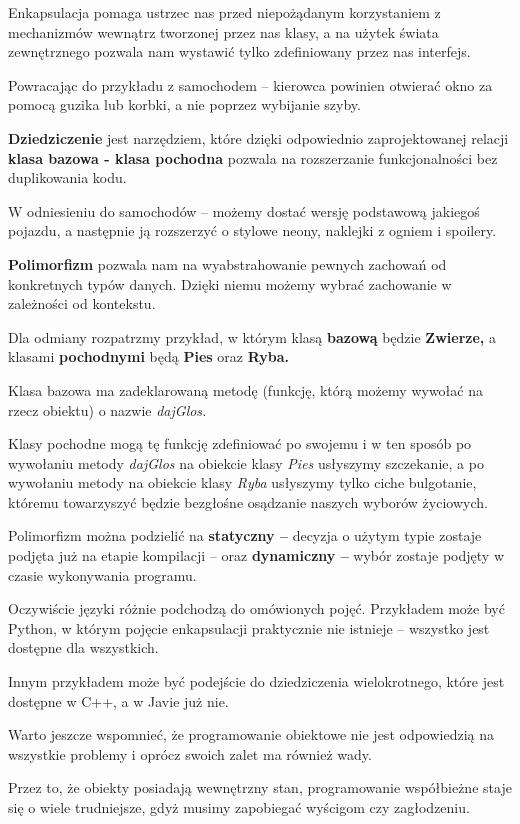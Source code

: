 Enkapsulacja pomaga ustrzec nas przed niepożądanym korzystaniem z mechanizmów wewnątrz tworzonej przez nas klasy, a na użytek świata zewnętrznego pozwala nam wystawić tylko zdefiniowany przez nas interfejs.

Powracając do przykładu z samochodem -- kierowca powinien otwierać okno za pomocą guzika lub korbki, a nie poprzez wybijanie szyby.

\textbf{Dziedziczenie} jest narzędziem, które dzięki odpowiednio zaprojektowanej relacji \textbf{klasa bazowa - klasa pochodna} pozwala na rozszerzanie funkcjonalności bez duplikowania kodu.

W odniesieniu do samochodów -- możemy dostać wersję podstawową jakiegoś pojazdu, a następnie ją rozszerzyć o stylowe neony, naklejki z ogniem i spoilery.

\textbf{Polimorfizm} pozwala nam na wyabstrahowanie pewnych zachowań od konkretnych typów danych. Dzięki niemu możemy wybrać zachowanie w zależności od kontekstu.

Dla odmiany rozpatrzmy przykład, w którym klasą \textbf{bazową} będzie \textbf{Zwierze,} a klasami \textbf{pochodnymi} będą \textbf{Pies} oraz \textbf{Ryba.}

Klasa bazowa ma zadeklarowaną metodę (funkcję, którą możemy wywołać na rzecz obiektu) o nazwie \textit{dajGlos.}

Klasy pochodne mogą tę funkcję zdefiniować po swojemu i w ten sposób po wywołaniu metody \textit{dajGlos} na obiekcie klasy \textit{Pies} usłyszymy szczekanie, a po wywołaniu metody na obiekcie klasy \textit{Ryba} usłyszymy tylko ciche bulgotanie, któremu towarzyszyć będzie bezgłośne osądzanie naszych wyborów życiowych.

Polimorfizm można podzielić na \textbf{statyczny --} decyzja o użytym typie zostaje podjęta już na etapie kompilacji -- oraz \textbf{dynamiczny --} wybór zostaje podjęty w czasie wykonywania programu.

Oczywiście języki różnie podchodzą do omówionych pojęć.
Przykładem może być Python, w którym pojęcie enkapsulacji praktycznie nie istnieje -- wszystko jest dostępne dla wszystkich.

Innym przykładem może być podejście do dziedziczenia wielokrotnego, które jest dostępne w C++, a w Javie już nie.

Warto jeszcze wspomnieć, że programowanie obiektowe nie jest odpowiedzią na wszystkie problemy i oprócz swoich zalet ma również wady.

Przez to, że obiekty posiadają wewnętrzny stan, programowanie współbieżne staje się o wiele trudniejsze, gdyż musimy zapobiegać wyścigom czy zagłodzeniu.

